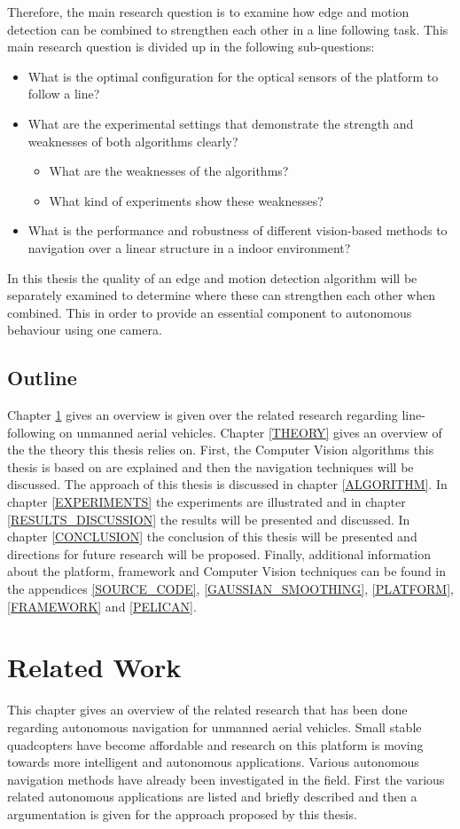 \documentclass[a4paper]{article}
\begin{document}
Therefore, the main research question is to examine how edge and motion detection can be combined to strengthen each other in a line following task. This main research question is divided up in the following sub-questions:
\begin{itemize}
\item What is the optimal configuration for the optical sensors of the platform to follow a line?
\item What are the experimental settings that demonstrate the strength and weaknesses of both algorithms clearly?
	\begin{itemize}
	\item What are the weaknesses of the algorithms?
	\item What kind of experiments show these weaknesses?
	\end{itemize}
\item What is the performance and robustness of different vision-based methods to navigation over a linear structure in a indoor environment?
\end{itemize}
In this thesis the quality of an edge and motion detection algorithm will be separately examined to determine where these can strengthen each other when combined. This in order to provide an essential component to autonomous behaviour using one camera.
\newpage
\subsection{Outline}
Chapter \ref{RELATED_WORK} gives an overview is given over the related research regarding line-following on unmanned aerial vehicles. Chapter \ref{THEORY} gives an overview of the the theory this thesis relies on. First, the Computer Vision algorithms this thesis is based on are explained and then the navigation techniques will be discussed. The approach of this thesis is discussed in chapter \ref{ALGORITHM}. In chapter \ref{EXPERIMENTS} the experiments are illustrated and in chapter \ref{RESULTS_DISCUSSION} the results will be presented and discussed. In chapter \ref{CONCLUSION} the conclusion of this thesis will be presented and directions for future research will be proposed. Finally, additional information about the platform, framework and Computer Vision techniques can be found in the appendices \ref{SOURCE_CODE}, \ref{GAUSSIAN_SMOOTHING}, \ref{PLATFORM}, \ref{FRAMEWORK} and \ref{PELICAN}.

\newpage
\section{Related Work}
\label{RELATED_WORK}
This chapter gives an overview of the related research that has been done regarding autonomous navigation for unmanned aerial vehicles. Small stable quadcopters have become affordable and research on this platform is moving towards more intelligent and autonomous applications. Various autonomous navigation methods have already been investigated in the field. First the various related autonomous applications are listed and briefly described and then a argumentation is given for the approach proposed by this thesis.
\end{document}
